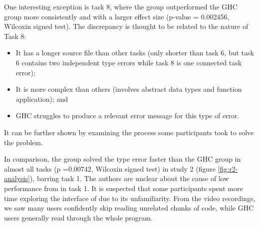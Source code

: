 One interesting exception is task 8, where the \chameleon{} group outperformed the GHC group more consistently and with a larger effect size (p-value = 0.002456, Wilcoxin signed test). The discrepancy is thought to be related to the nature of Task 8:
\begin{itemize}
    \item {It has a longer source file than other tasks (only shorter than task 6, but task
    6 contains two independent type errors while task 8 is one connected task
    error);}
    \item {It is more complex than others (involves abstract data types and function application); and
    }
    \item {
        GHC struggles to produce a relevant error message for this type of error.
    }
  \end{itemize}
It can be further shown by examining the process some participants took to solve the problem.

  




In comparison, the \chameleon{} group solved the type error faster than the GHC group in almost all tasks (p =0.00742, Wilcoxin signed test) in study 2 (figure \ref{fig:r2-analysis}), barring task 1. The authors are unclear about the cause of low performance from \chameleon{} in task 1. It is suspected that some participants spent more time exploring the interface of \chameleon{} due to its unfamiliarity. From the video recordings, we saw many \chameleon{} users confidently skip reading unrelated chunks of code, while GHC users generally read through the whole program.


